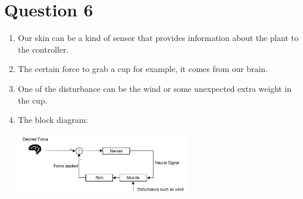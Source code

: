 \documentclass[12pt]{article}
\begin{document}
\section*{Question 6}
    \begin{enumerate}[label=(\alph*)]
        \item Our skin can be a kind of sensor that provides information about the plant to the controller.

        \item The certain force to grab a cup for example, it comes from our brain.

        \item One of the disturbance can be the wind or some unexpected extra weight in the cup.

        \item The block diagram:
        \begin{center}
            \includegraphics[width=0.6\textwidth]{Q6.png}
        \end{center}

    \end{enumerate}
\end{document}
